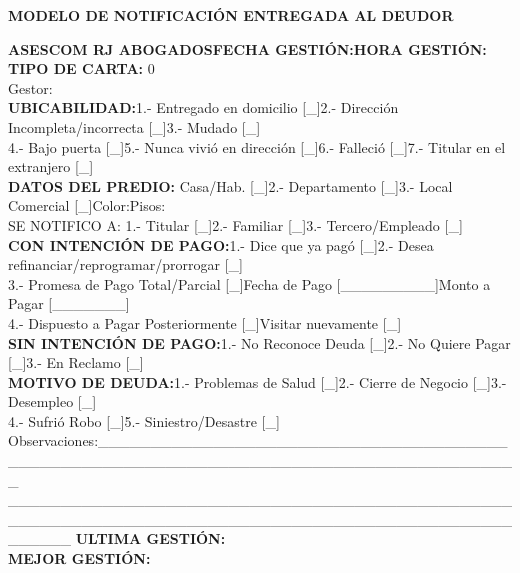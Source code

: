 \begin{center}
\textbf{ MODELO DE NOTIFICACIÓN ENTREGADA AL DEUDOR}
\end{center}
{\noindent
\textbf{ASESCOM RJ ABOGADOS}\hfill \textbf{FECHA GESTIÓN:}\hfill \textbf{HORA GESTIÓN:}\hfill \space\\         \textbf{TIPO DE CARTA:} {0}\\
Gestor:\\
\textbf{UBICABILIDAD:}\hfill 1.- Entregado en domicilio [\_]\hfill 2.- Dirección Incompleta/incorrecta [\_]\hfill 3.- Mudado [\_]\hfill \space\\
4.- Bajo puerta [\_]\hfill 5.- Nunca vivió en dirección [\_]\hfill 6.- Falleció [\_]\hfill 7.- Titular en el extranjero [\_]\hfill \space\\
\textbf{DATOS DEL PREDIO:} Casa/Hab. [\_]\hfill 2.- Departamento [\_]\hfill 3.- Local Comercial [\_]\hfill Color:\hfill Pisos:\hfill \space\\
SE NOTIFICO A: 1.- Titular [\_]\hfill 2.- Familiar [\_]\hfill 3.- Tercero/Empleado [\_]\hfill \space\\ 	
\textbf{CON INTENCIÓN DE PAGO:}\hfill 1.- Dice que ya pagó [\_]\hfill 2.- Desea refinanciar/reprogramar/prorrogar [\_]\hfill \space\\
3.- Promesa de Pago Total/Parcial [\_]\hfill Fecha de Pago [\_\_\_\_\_\_\_\_\_]\hfill Monto a Pagar [\_\_\_\_\_\_\_]\hfill \space\\
4.- Dispuesto a Pagar Posteriormente [\_]\hfill Visitar nuevamente [\_]\hfill \space\\
\textbf{SIN INTENCIÓN DE PAGO:}\hfill 1.- No Reconoce Deuda [\_]\hfill 2.- No Quiere Pagar [\_]\hfill 3.- En Reclamo [\_]\hfill \space\\
\textbf{MOTIVO DE DEUDA:}\hfill 1.- Problemas de Salud [\_]\hfill 2.- Cierre de Negocio [\_]\hfill 3.- Desempleo [\_]\hfill \space\\
4.- Sufrió Robo [\_]\hfill 5.- Siniestro/Desastre [\_]\hfill \space\\
Observaciones:\_\_\_\_\_\_\_\_\_\_\_\_\_\_\_\_\_\_\_\_\_\_\_\_\_\_\_\_\_\_\_\_\_\_\_\_\_\_\_\_\_\_\_\_\_\_\_\_\_\_\_\_\_\_\_\_\_\_\_\_\_\_\_\_\_\_\_\_\_\_\_\_\_\_\_\_\_\_\_\_\_\_\_\_\_\_\_\_\\
\_\_\_\_\_\_\_\_\_\_\_\_\_\_\_\_\_\_\_\_\_\_\_\_\_\_\_\_\_\_\_\_\_\_\_\_\_\_\_\_\_\_\_\_\_\_\_\_\_\_\_\_\_\_\_\_\_\_\_\_\_\_\_\_\_\_\_\_\_\_\_\_\_\_\_\_\_\_\_\_\_\_\_\_\_\_\_\_\_\_\_\_\_\_\_\_\_\_\_\_\_\_
\textbf{ULTIMA GESTIÓN:}\\
\textbf{MEJOR GESTIÓN:}
}









